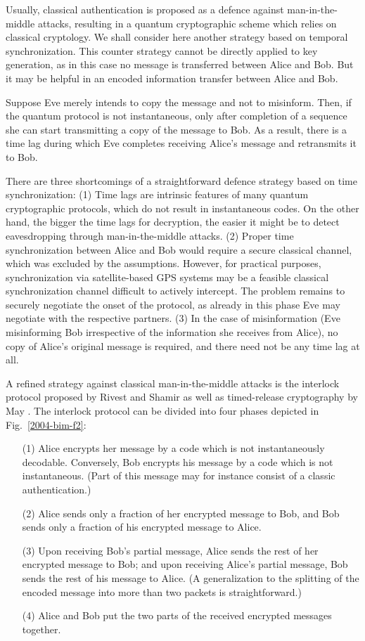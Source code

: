 \documentclass{ws-ijqi}
\begin{document}
Usually, classical authentication is proposed as a defence
against man-in-the-middle attacks, resulting in a quantum cryptographic scheme which relies on
classical cryptology.
We shall consider here another strategy based on temporal synchronization.
This counter strategy cannot be directly applied to key generation,
as in this case no message is transferred between Alice and Bob.
But it may be helpful in an encoded information transfer between Alice and Bob.

Suppose Eve merely intends to copy the message and not to misinform.
Then, if the quantum protocol is not instantaneous,
only after completion of a sequence
she can start transmitting a copy of the message to Bob.
As a result, there is a time lag
during which Eve completes receiving Alice's message and retransmits it to Bob.

There are three shortcomings of a straightforward defence strategy based on time synchronization:
(1)
Time lags are intrinsic features of many quantum cryptographic protocols,
which do not result in instantaneous codes.
On the other hand, the bigger the time lags for decryption,
the easier it might be to detect eavesdropping through man-in-the-middle attacks.
(2)
Proper time synchronization between Alice and Bob would require a secure classical channel,
which was excluded by the assumptions.
However, for practical purposes, synchronization via satellite-based GPS systems
may be a feasible classical synchronization channel difficult to actively intercept.
The problem remains to securely negotiate the onset of the protocol,
as already in this phase Eve may negotiate with the respective partners.
(3)
In the case of misinformation (Eve misinforming Bob irrespective of the information she receives from Alice),
no copy of Alice's original message is required,
and there need not be any time lag at all.


A refined strategy against classical man-in-the-middle attacks
is the interlock protocol proposed by Rivest and Shamir \cite{RivestSh84}
as well as timed-release cryptography by May \cite{May93,RivestSh96}.
The interlock protocol can be divided into four phases depicted in Fig.~\ref{2004-bim-f2}:
\begin{itemize}
\item[(1)]
Alice encrypts her message by a code which is not instantaneously decodable.
Conversely, Bob encrypts his message by a code which is not instantaneous.
(Part of this message may for instance consist of a classic authentication.)
\item[(2)]
Alice sends only a fraction of her encrypted message to Bob,
and Bob sends only a fraction of his encrypted message to Alice.
\item[(3)]
Upon receiving Bob's partial message,
Alice sends the rest of her encrypted message to Bob;
and upon receiving Alice's partial message, Bob sends the rest of his message to Alice.
(A generalization to the splitting of the encoded message into more than two packets is straightforward.)
\item[(4)]
Alice and
Bob put the two parts of the received encrypted messages together.
\end{itemize}
\end{document}
